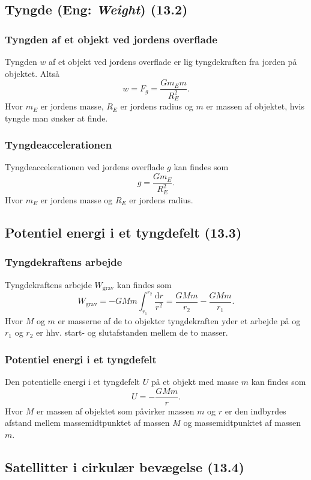 \subsection{Tyngde (Eng: \textit{Weight}) (13.2)}

\subsubsection{Tyngden af et objekt ved jordens overflade} \label{afs:tyngde}
Tyngden $w$ af et objekt ved jordens overflade er lig tyngdekraften fra jorden på objektet. Altså
\[ 
w = F_g = \frac{Gm_Em}{R_E^2}
.\]
Hvor $m_E$ er jordens masse, $R_E$ er jordens radius og $m$ er massen af objektet, hvis tyngde man ønsker at finde.


\subsubsection{Tyngdeaccelerationen} \label{afs:tynacc}
Tyngdeaccelerationen ved jordens overflade $g$ kan findes som
\[ 
g = \frac{Gm_E}{R_E^2}
.\]
Hvor $m_E$ er jordens masse og $R_E$ er jordens radius. 


\subsection{Potentiel energi i et tyngdefelt (13.3)}

\subsubsection{Tyngdekraftens arbejde} \label{afs:tynarb}
Tyngdekraftens arbejde $W_{\text{grav}}$ kan findes som
\[ 
W_{\text{grav}} = -GMm \int_{r_1}^{r_2} \frac{\mathrm{d}r}{r^2} = \frac{GMm}{r_2} - \frac{GMm}{r_1} 
.\]
Hvor $M$ og $m$ er masserne af de to objekter tyngdekraften yder et arbejde på og $r_1$ og $r_2$ er hhv. start- og slutafstanden mellem de to masser.


\subsubsection{Potentiel energi i et tyngdefelt} \label{afs:tynpot}
Den potentielle energi i et tyngdefelt $U$ på et objekt med masse $m$ kan findes som
\[ 
U = - \frac{GMm}{r}
.\]
Hvor $M$ er massen af objektet som påvirker massen $m$ og $r$ er den indbyrdes afstand mellem massemidtpunktet af massen $M$ og massemidtpunktet af massen $m$.


\subsection{Satellitter i cirkulær bevægelse (13.4)}

